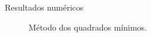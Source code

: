 \documentclass[10pt]{beamer}
\begin{document}
\begin{frame}{Resultados numéricos}
\begin{figure}[hbt]
\caption{Método dos quadrados mínimos.}
\label{cap_acf_fig12}
\endminipage\hfill
\end{figure}
\end{frame}
\end{document}
